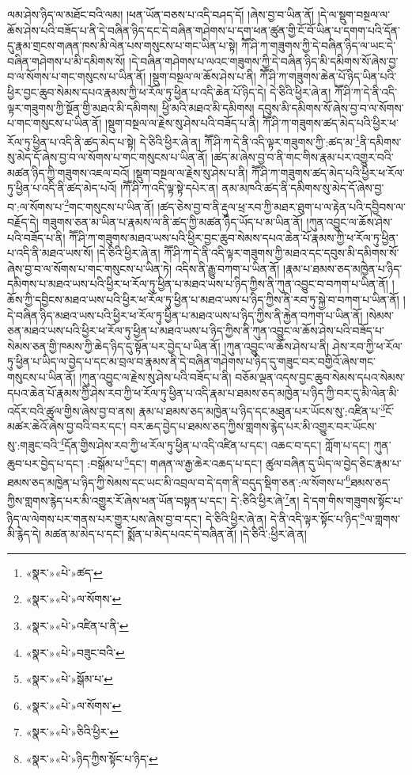 ལམ་ཤེས་ཉིད་ལ་མཐོང་བའི་ལམ། །ཕན་ཡོན་བཅས་པ་འདི་བཤད་དོ། །ཞེས་བྱ་བ་ཡིན་ནོ། །དེ་ལ་སྡུག་བསྔལ་ལ་ཆོས་ཤེས་པའི་བཟོད་པ་ནི་དེ་བཞིན་ཉིད་དང་དེ་བཞིན་གཤེགས་པ་དག་ཕན་ཚུན་གྱི་ངོ་བོ་ཡིན་པ་དགག་པའི་དོན་དུ་རྣམ་གྲངས་གཞན་ཁས་མི་ལེན་པས་གསུངས་པ་གང་ཡིན་པ་སྟེ། ཀཽ་ཤི་ཀ་གཟུགས་ཀྱི་དེ་བཞིན་ཉིད་ལ་ཡང་དེ་བཞིན་གཤེགས་པ་མི་དམིགས་སོ། །དེ་བཞིན་གཤེགས་པ་ལའང་གཟུགས་ཀྱི་དེ་བཞིན་ཉིད་མི་དམིགས་སོ་ཞེས་བྱ་བ་ལ་སོགས་པ་གང་གསུངས་པ་ཡིན་ནོ། །སྡུག་བསྔལ་ལ་ཆོས་ཤེས་པ་ནི། ཀཽ་ཤི་ཀ་གཟུགས་ཆེན་པོ་ཉིད་ཡིན་པའི་ཕྱིར་བྱང་ཆུབ་སེམས་དཔའ་རྣམས་ཀྱི་ཕ་རོལ་ཏུ་ཕྱིན་པ་འདི་ཆེན་པོ་ཉིད་དེ། དེ་ཅིའི་ཕྱིར་ཞེ་ན། ཀཽ་ཤི་ཀ་དེ་ནི་འདི་ལྟར་གཟུགས་ཀྱི་སྔོན་གྱི་མཐའ་མི་དམིགས། ཕྱི་མའི་མཐའ་མི་དམིགས། དབུས་མི་དམིགས་སོ་ཞེས་བྱ་བ་ལ་སོགས་པ་གང་གསུངས་པ་ཡིན་ནོ། །སྡུག་བསྔལ་ལ་རྗེས་སུ་ཤེས་པའི་བཟོད་པ་ནི། ཀཽ་ཤི་ཀ་གཟུགས་ཚད་མེད་པའི་ཕྱིར་ཕ་རོལ་ཏུ་ཕྱིན་པ་འདི་ནི་ཚད་མེད་པ་སྟེ། དེ་ཅིའི་ཕྱིར་ཞེ་ན། ཀཽ་ཤི་ཀ་དེ་ནི་འདི་ལྟར་གཟུགས་ཀྱི་:ཚད་མ་\footnote{«སྣར་»«པེ་»ཚད་}ནི་དམིགས་སུ་མེད་དོ་ཞེས་བྱ་བ་ལ་སོགས་པ་གང་གསུངས་པ་ཡིན་ནོ། །ཚད་མ་ཞེས་བྱ་བ་ནི་གང་གིས་རྣམ་པར་འགྱུར་བའི་མཚན་ཉིད་ཀྱི་གཟུགས་འཇལ་བའོ། །སྡུག་བསྔལ་ལ་རྗེས་སུ་ཤེས་པ་ནི། ཀཽ་ཤི་ཀ་གཟུགས་ཚད་མེད་པའི་ཕྱིར་ཕ་རོལ་ཏུ་ཕྱིན་པ་འདི་ནི་ཚད་མེད་པའོ། །ཀཽ་ཤི་ཀ་འདི་ལྟ་སྟེ་དཔེར་ན། ནམ་མཁའི་ཚད་ནི་དམིགས་སུ་མེད་དོ་ཞེས་བྱ་བ་:ལ་སོགས་པ་\footnote{«སྣར་»«པེ་»ལ་སོགས་}གང་གསུངས་པ་ཡིན་ནོ། །ཚད་ཅེས་བྱ་བ་ནི་རྡུལ་ཕྲ་རབ་ཀྱི་མཐར་ཐུག་པ་ལ་རྟེན་པའི་དབྱིབས་ལ་བརྗོད་དེ། གཟུགས་ཅན་མ་ཡིན་པ་རྣམས་ལ་ནི་ཚད་ཀྱི་མཚན་ཉིད་ཡོད་པ་མ་ཡིན་ནོ། །ཀུན་འབྱུང་ལ་ཆོས་ཤེས་པའི་བཟོད་པ་ནི། ཀཽ་ཤི་ཀ་གཟུགས་མཐའ་ཡས་པའི་ཕྱིར་བྱང་ཆུབ་སེམས་དཔའ་ཆེན་པོ་རྣམས་ཀྱི་ཕ་རོལ་ཏུ་ཕྱིན་པ་འདི་ནི་མཐའ་ཡས་སོ། །དེ་ཅིའི་ཕྱིར་ཞེ་ན། ཀཽ་ཤི་ཀ་དེ་ནི་འདི་ལྟར་གཟུགས་ཀྱི་མཐའ་དང་དབུས་མི་དམིགས་སོ་ཞེས་བྱ་བ་ལ་སོགས་པ་གང་གསུངས་པ་ཡིན་ཏེ། འདིས་ནི་རྒྱུ་བཀག་པ་ཡིན་ནོ། །རྣམ་པ་ཐམས་ཅད་མཁྱེན་པ་ཉིད་དམིགས་པ་མཐའ་ཡས་པའི་ཕྱིར་ཕ་རོལ་ཏུ་ཕྱིན་པ་མཐའ་ཡས་པ་ཉིད་ཀྱིས་ནི་ཀུན་འབྱུང་བ་བཀག་པ་ཡིན་ནོ། །ཆོས་ཀྱི་དབྱིངས་མཐའ་ཡས་པའི་ཕྱིར་ཕ་རོལ་ཏུ་ཕྱིན་པ་མཐའ་ཡས་པ་ཉིད་ཀྱིས་ནི་རབ་ཏུ་སྐྱེ་བ་བཀག་པ་ཡིན་ནོ། །དེ་བཞིན་ཉིད་མཐའ་ཡས་པའི་ཕྱིར་ཕ་རོལ་ཏུ་ཕྱིན་པ་མཐའ་ཡས་པ་ཉིད་ཀྱིས་ནི་རྐྱེན་བཀག་པ་ཡིན་ནོ། །སེམས་ཅན་མཐའ་ཡས་པའི་ཕྱིར་ཕ་རོལ་ཏུ་ཕྱིན་པ་མཐའ་ཡས་པ་ཉིད་ཀྱིས་ནི་ཀུན་འབྱུང་ལ་ཆོས་ཤེས་པའི་བཟོད་པ་སེམས་ཅན་གྱི་ཁམས་ཀྱི་ཆེད་ཉིད་དུ་སྟོན་པར་བྱེད་པ་ཡིན་ནོ། །ཀུན་འབྱུང་ལ་ཆོས་ཤེས་པ་ནི། ཤེས་རབ་ཀྱི་ཕ་རོལ་ཏུ་ཕྱིན་པ་ཡིད་ལ་བྱེད་པ་དང་མ་བྲལ་བ་རྣམས་ནི་དེ་བཞིན་གཤེགས་པ་ཉིད་དུ་གཟུང་བར་བགྱིའོ་ཞེས་གང་གསུངས་པ་ཡིན་ནོ། །ཀུན་འབྱུང་ལ་རྗེས་སུ་ཤེས་པའི་བཟོད་པ་ནི། བཅོམ་ལྡན་འདས་བྱང་ཆུབ་སེམས་དཔའ་སེམས་དཔའ་ཆེན་པོ་རྣམས་ཀྱི་ཤེས་རབ་ཀྱི་ཕ་རོལ་ཏུ་ཕྱིན་པ་འདི་རྣམ་པ་ཐམས་ཅད་མཁྱེན་པ་ཉིད་ཀྱི་བར་དུ་མི་ལེན་མི་འདོར་བའི་ཚུལ་གྱིས་ཞེས་བྱ་བ་ནས། རྣམ་པ་ཐམས་ཅད་མཁྱེན་པ་ཉིད་དང་མཐུན་པར་ཡོངས་སུ་:འཛིན་པ་\footnote{«སྣར་»«པེ་»འཛིན་པ་ནི་}ངོ་མཚར་ཆེའོ་ཞེས་བྱ་བའི་བར་དང་། བར་ཆད་བྱེད་པ་ཐམས་ཅད་ཀྱིས་གླགས་རྙེད་པར་མི་འགྱུར་བར་ཡོངས་སུ་:གཟུང་བའི་\footnote{«སྣར་»«པེ་»བཟུང་བའི་}དོན་གྱིས་ཤེས་རབ་ཀྱི་ཕ་རོལ་ཏུ་ཕྱིན་པ་འདི་འཛིན་པ་དང་། འཆང་བ་དང་། ཀློག་པ་དང་། ཀུན་ཆུབ་པར་བྱེད་པ་དང་། :བསྒོམ་པ་\footnote{«སྣར་»«པེ་»སྒོམ་པ་}དང་། གཞན་ལ་རྒྱ་ཆེར་འཆད་པ་དང་། ཚུལ་བཞིན་དུ་ཡིད་ལ་བྱེད་ཅིང་རྣམ་པ་ཐམས་ཅད་མཁྱེན་པ་ཉིད་ཀྱི་སེམས་དང་ཡང་མི་འབྲལ་བ་དེ་དག་ནི་བདུད་སྡིག་ཅན་:ལ་སོགས་པ་\footnote{«སྣར་»«པེ་»ལ་སོགས་}ཐམས་ཅད་ཀྱིས་གླགས་རྙེད་པར་མི་འགྱུར་རོ་ཞེས་ཕན་ཡོན་བསྟན་པ་དང་། དེ་:ཅིའི་ཕྱིར་ཞེ་\footnote{«སྣར་»«པེ་»ཅིའི་ཕྱིར་}ན། དེ་དག་གིས་གཟུགས་སྟོང་པ་ཉིད་ལ་ལེགས་པར་གནས་པར་གྱུར་པས་ཞེས་བྱ་བ་དང་། དེ་ཅིའི་ཕྱིར་ཞེ་ན། དེ་ནི་འདི་ལྟར་སྟོང་པ་ཉིད་\footnote{«སྣར་»«པེ་»ཉིད་ཀྱིས་སྟོང་པ་ཉིད་}ལ་གླགས་མི་རྙེད་དེ། མཚན་མ་མེད་པ་དང་། སྨོན་པ་མེད་པའང་དེ་བཞིན་ནོ། །དེ་ཅིའི་:ཕྱིར་ཞེ་ན། 